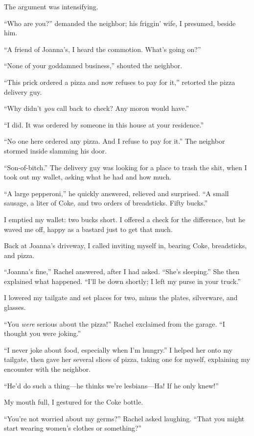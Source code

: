 The argument was intensifying.

``Who are you?'' demanded the neighbor; his friggin' wife, I presumed,
beside him.

``A friend of Joanna's, I heard the commotion. What's going on?''

``None of your goddamned business,'' shouted the neighbor.

``This prick ordered a pizza and now refuses to pay for it,'' retorted
the pizza delivery guy.

``Why didn't \emph{you} call back to check? Any moron would have.''

``I did. It was ordered by someone in this house at your residence.''

``No one here ordered any pizza. And I refuse to pay for it.'' The
neighbor stormed inside slamming his door.

``Son-of-bitch.'' The delivery guy was looking for a place to trash the
shit, when I took out my wallet, asking what he had and how much.

``A large pepperoni,'' he quickly answered, relieved and surprised. ``A
small sausage, a liter of Coke, and two orders of breadsticks. Fifty
bucks.''

I emptied my wallet: two bucks short. I offered a check for the
difference, but he waved me off, happy as a bastard just to get that
much.

Back at Joanna's driveway, I called inviting myself in, bearing Coke,
breadsticks, and pizza.

``Joanna's fine,'' Rachel answered, after I had asked. ``She's
sleeping.'' She then explained what happened. ``I'll be down shortly; I
left my purse in your truck.''

I lowered my tailgate and set places for two, minus the plates,
silverware, and glasses.

``You \emph{were} serious about the pizza!'' Rachel exclaimed from the
garage. ``I thought you were joking.''

``I never joke about food, especially when I'm hungry.'' I helped her
onto my tailgate, then gave her several slices of pizza, taking one for
myself, explaining my encounter with the neighbor.

``He'd do such a thing---he thinks we're lesbians---Ha! If he only
knew!''

My mouth full, I gestured for the Coke bottle.

``You're not worried about my germs?'' Rachel asked laughing. ``That you
might start wearing women's clothes or something?''

